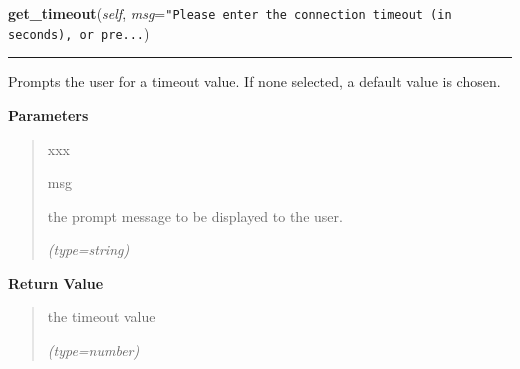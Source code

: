 \hspace{.8\funcindent}\begin{boxedminipage}{\funcwidth}

    \raggedright \textbf{get\_timeout}(\textit{self}, \textit{msg}={\tt "Please enter the connection timeout (in seconds), or pre\texttt{...}})

    \vspace{-1.5ex}

    \rule{\textwidth}{0.5\fboxrule}
\setlength{\parskip}{2ex}
    Prompts the user for a timeout value. If none selected, a default value
    is chosen.

\setlength{\parskip}{1ex}
      \textbf{Parameters}
      \vspace{-1ex}

      \begin{quote}
        \begin{Ventry}{xxx}

          \item[msg]

          the prompt message to be displayed to the user.

            {\it (type=string)}

        \end{Ventry}

      \end{quote}

      \textbf{Return Value}
    \vspace{-1ex}

      \begin{quote}
      the timeout value

      {\it (type=number)}

      \end{quote}

    \end{boxedminipage}

    \label{Serial_conn:Serial_conn:close}

    \vspace{0.5ex}

